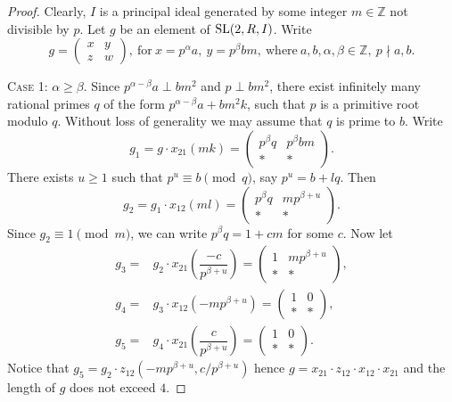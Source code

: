 \begin{proof}
Clearly, $I$ is a principal ideal generated by some integer $m\in\mathbb{Z}$ not divisible by $p$.
Let $g$ be an element of $\operatorname{SL}(2,R,I)$. Write
\[ g=\begin{pmatrix}x & y \\ z & w\end{pmatrix},\ \text{for}\ x=p^\alpha a,\ y=p^\beta bm,\ \text{where}\ a,b,\alpha,\beta\in\mathbb{Z},\ p\nmid a,b. \]

\textsc{Case 1:} $\alpha\geqslant\beta$. 
Since $p^{\alpha-\beta}a\perp bm^2$ and $p\perp bm^2$, there exist infinitely many rational primes $q$ of the form $p^{\alpha-\beta}a+bm^2k$,
such that $p$ is a primitive root modulo $q$. 
Without loss of generality we may assume that $q$ is prime to $b$. 
Write
\[ g_1=g\cdot x_{21}(mk) =
\begin{pmatrix} p^\beta q & p^\beta bm \\ * & * \end{pmatrix}.\]
There exists $u\geqslant 1$ such that $p^u\equiv b\pmod q$, say $p^u=b+lq$. Then
\[ g_2 = g_1\cdot x_{12}(ml) =
\begin{pmatrix} p^\beta q & mp^{\beta+u} \\ * & * \end{pmatrix}. \]
Since $g_2\equiv 1\pmod m$, we can write $p^\beta q=1+cm$ for some $c$. Now let
\begin{align*}
g_3 = & g_2\cdot x_{21}\left(\dfrac{-c}{p^{\beta+u}}\right) =
\begin{pmatrix} 1 & mp^{\beta+u} \\ * & * \end{pmatrix}, \\
g_4 = & g_3\cdot x_{12}\left(-mp^{\beta+u}\right) =
\begin{pmatrix} 1 & 0 \\ * & * \end{pmatrix}, \\
g_5 = & g_4\cdot x_{21}\left(\dfrac{c}{p^{\beta+u}}\right) =
\begin{pmatrix} 1 & 0 \\ * & * \end{pmatrix}.
\end{align*}
Notice that $g_5=g_2\cdot z_{12}\left(-mp^{\beta+u},c/p^{\beta+u}\right)$ hence $g=x_{21} \cdot z_{12} \cdot x_{12} \cdot x_{21}$
and the length of $g$ does not exceed $4$.


\end{proof}
